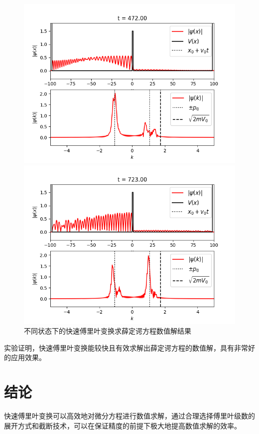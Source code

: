 \documentclass[UTF8,ctexart,a4paper,11pt,openany]{article}
\theoremstyle{definition}
\begin{document}
\begin{figure}[H]
    \begin{minipage}{0.5\textwidth}
        \centering
        \includegraphics[width=\linewidth]{pics/P6.3.png}
    \end{minipage}%
    \begin{minipage}{0.5\textwidth}
        \centering
        \includegraphics[width=\linewidth]{pics/P6.4.png}
    \end{minipage}
    \caption{不同状态下的快速傅里叶变换求薛定谔方程数值解结果}
\end{figure}
实验证明，快速傅里叶变换能较快且有效求解出薛定谔方程的数值解，具有非常好的应用效果。
\section{结论}
快速傅里叶变换可以高效地对微分方程进行数值求解，通过合理选择傅里叶级数的展开方式和截断技术，可以在保证精度的前提下极大地提高数值求解的效率。
\clearpage
\end{document}
